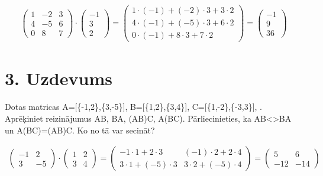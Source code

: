 \documentclass{article}
\begin{document}
\begin{gather*}
    \begin{pmatrix}
        1 & -2 & 3\\
        4 & -5 & 6\\
        0 & 8 & 7
    \end{pmatrix}
    \cdot
    \begin{pmatrix}
        -1\\
        3\\
        2
    \end{pmatrix}
    =
    \begin{pmatrix}
        1 \cdot (-1) + (-2) \cdot 3 + 3 \cdot 2\\
        4 \cdot (-1) + (-5) \cdot 3 + 6 \cdot 2\\
        0 \cdot (-1) + 8 \cdot 3 + 7 \cdot 2
    \end{pmatrix}
    =
    \begin{pmatrix}
        -1\\
        9\\
        36
    \end{pmatrix}
\end{gather*}

\clearpage

\section*{3. Uzdevums}
Dotas matricas A=[\{-1,2\},\{3,-5\}], B=[\{1,2\},\{3,4\}], C=[\{1,-2\},\{-3,3\}], . Aprēķiniet reizinājumus AB, BA, (AB)C, A(BC). Pārliecinieties, ka AB<>BA un A(BC)=(AB)C. Ko no tā var secināt?

\begin{gather*}
    \begin{pmatrix}
        -1 & 2\\
        3 & -5
    \end{pmatrix}
    \cdot
    \begin{pmatrix}
        1 & 2\\
        3 & 4
    \end{pmatrix}
    =
    \begin{pmatrix}
        -1 \cdot 1 + 2 \cdot 3 & (-1) \cdot 2 + 2 \cdot 4\\
        3 \cdot 1 + (-5) \cdot 3 & 3 \cdot 2 + (-5) \cdot 4
    \end{pmatrix}
    =
    \begin{pmatrix}
        5 & 6\\
        -12 & -14
    \end{pmatrix}
\end{gather*}
\end{document}
